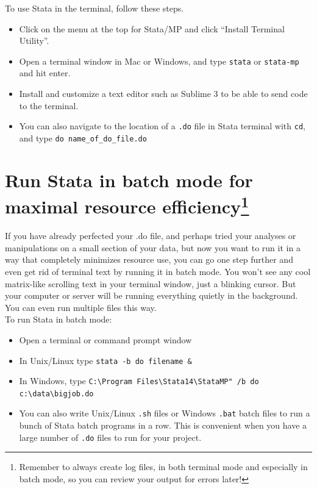 \documentclass[11pt]{article}
\begin{document}
\noindent To use Stata in the terminal, follow these steps.
\begin{itemize}
\item Click on the menu at the top for Stata/MP and click ``Install Terminal Utility''.
\item Open a terminal window in Mac or Windows, and type \verb!stata! or \verb!stata-mp! and hit enter.
\item Install and customize a text editor such as Sublime 3 to be able to send code to the terminal.
\item You can also navigate to the location of a \verb!.do! file in Stata terminal with \verb!cd!, and type \verb!do name_of_do_file.do!
\end{itemize}

\section{Run Stata in batch mode for maximal resource efficiency\protect\footnote{Remember to always create log files, in both terminal mode and especially in batch mode, so you can review your output for errors later!}}

\noindent If you have already perfected your .do file, and perhaps tried your analyses or manipulations on a small section of your data, but now you want to run it in a way that completely minimizes resource use, you can go one step further and even get rid of terminal text by running it in batch mode. You won't see any cool matrix-like scrolling text in your terminal window, just a blinking cursor. But your computer or server will be running everything quietly in the background. You can even run multiple files this way. \\

\noindent To run Stata in batch mode:
\begin{itemize}
\item Open a terminal or command prompt window
\item In Unix/Linux type \verb!stata -b do filename &!
\item In Windows, type \verb!C:\Program Files\Stata14\StataMP" /b do c:\data\bigjob.do!
\item You can also write Unix/Linux \verb!.sh! files or Windows \verb!.bat! batch files to run a bunch of Stata batch programs in a row. This is convenient when you have a large number of \verb!.do! files to run for your project.
\end{itemize}
\end{document}
